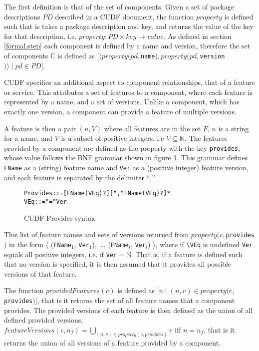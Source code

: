The first definition is that of the set of components.
Given a set of package descriptions $PD$ described in a CUDF document,
the function $property$ is defined such that is takes a package description and key, and returns the value of the key for that description, i.e. $property: PD \times key \rightarrow value$. 
As defined in section \ref{formal.step} each component is defined by a name and version,
therefore the set of components $\mathbb{C}$ is defined as $[\langle property(pd, $\verb+name+$), property(pd, $\verb+version+$) \rangle \mid pd \in PD]$.

CUDF specifies an additional aspect to component relationships, that of a feature or service.
This attributes a set of features to a component, where each feature is represented by a name, and a set of versions.
Unlike a component, which has exactly one version, a component can provide a feature of multiple versions.

A feature is then a pair $(n,V)$ where all features are in the set $F$, $n$ is a string for a name, and $V$ is a subset of positive integers, i.e $V \subseteq \mathbb{N}$.
The features provided by a component are defined as the property with the key \verb+provides+, whose value follows the BNF grammar shown in figure \ref{formal.cudfprovidessyntax}.
This grammar defines \verb+FName+ as a (string) feature name and \verb+Ver+ as a (positive integer) feature version, and each feature is separated by the delimiter ``,''

\begin{figure}[htp] 
\begin{center}
\begin{alltt}
Provides ::= [FName (VEq)?]["," FName (VEq)?]*
VEq ::= "=" Ver
\end{alltt}
  \caption[Provides syntax]{CUDF Provides syntax}
  \label{formal.cudfprovidessyntax}
\end{center}
\end{figure}

This list of feature names and sets of versions returned from  $property(c,$\verb+provides+$)$ in the form $\langle$ (\verb+FName+$_1$, {\verb+Ver+$_1$}), \ldots, (\verb+FName+$_i$, {\verb+Ver+$_i$}) $\rangle$,
where if \verb+\VEq+ is undefined {\verb+Ver+} equals all positive integers, i.e. if {\verb+Ver+}$= \mathbb{N}$.
That is, if a feature is defined such that no version is specified, it is then assumed that it provides all possible versions of that feature.
 
The function $providedFeatures(c)$ is defined as $[n \mid (n,v) \in property(c,$\verb+provides+$)]$,
that is it returns the set of all feature names that a component provides.
The provided versions of each feature is then defined as the union of all defined provided versions, 
$featureVersions(c,n_f) = \bigcup_{(n,v) \in property(c,provides)} v \mbox{ iff } n = n_f$,
that is it returns the union of all versions of a feature provided by a component.


